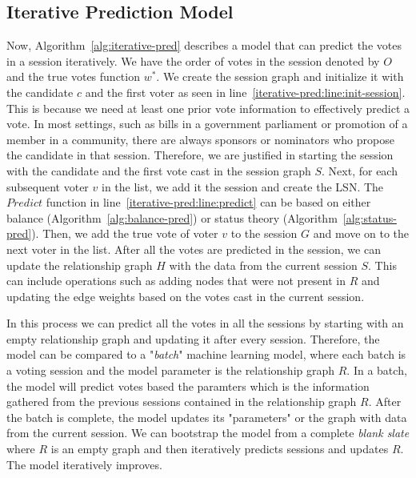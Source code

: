 \subsection{Iterative Prediction Model}

Now, Algorithm~\ref{alg:iterative-pred} describes a model that can predict the votes in a session iteratively. We have the order of votes in the session denoted by $O$ and the true votes function $w^{*}$. We create the session graph and initialize it with the candidate $c$ and the first voter as seen in line~\ref{iterative-pred:line:init-session}. This is because we need at least one prior vote information to effectively predict a vote. In most settings, such as bills in a government parliament or promotion of a member in a community, there are always  sponsors or nominators who propose the candidate in that session. Therefore, we are justified in starting the session with the candidate and the first vote cast in the session graph $S$. Next, for each subsequent voter $v$ in the list, we add it the session and create the LSN. The $Predict$ function in line~\ref{iterative-pred:line:predict} can be based on either balance (Algorithm~\ref{alg:balance-pred}) or status theory (Algorithm~\ref{alg:status-pred}). Then, we add the true vote of voter $v$ to the session $G$ and move on to the next voter in the list. After all the votes are predicted in the session, we can update the relationship graph $H$ with the data from the current session $S$. This can include operations such as adding nodes that were not present in $R$ and updating the edge weights based on the votes cast in the current session.

In this process we can predict all the votes in all the sessions by starting with an empty relationship graph and updating it after every session. Therefore, the model can be compared to a "\textit{batch}" machine learning model, where each batch is a voting session and the model parameter is the relationship graph $R$. In a batch, the model will predict votes based the paramters which is the information gathered from the previous sessions contained in the relationship graph $R$. After the batch is complete, the model updates its "parameters" or the graph with data from the current session. We can bootstrap the model from a complete \textit{blank slate} where $R$ is an empty graph and then iteratively predicts sessions and updates $R$. The model iteratively improves.

